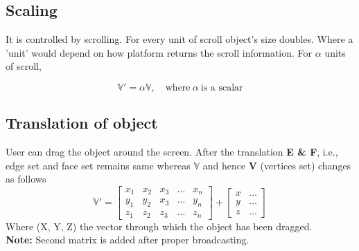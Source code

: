 \subsection{Scaling}
\indent It is controlled by scrolling. For every unit of scroll object's size doubles. Where a 'unit' would depend on how platform returns the scroll information. For $\alpha$ units of scroll,

$$ \mathbb{V}' = \alpha \mathbb{V}, \quad \textrm{where} \ \alpha \ \textrm{is a scalar}$$
\subsection{Translation of object}
User can drag the object around the screen. After the translation \textbf{E \& F}, i.e., edge set and face set remains same whereas  $\mathbb{V}$ and hence \textbf{V} (vertices set) changes as follows
$$ \mathbb{V}' = 
 \begin{bmatrix}
    x_{1}       & x_{2} & x_{3} & \dots & x_{n} \\
    y_{1}       & y_{2} & x_{3} & \dots & y_{n} \\
    z_{1}       & z_{2} & z_{3} & \dots & z_{n}
\end{bmatrix}
+
\begin {bmatrix}
	x & \dots \\
    y & \dots \\
    z & \dots
   
  \end{bmatrix}
$$
Where (X, Y, Z) the vector through which the object has been dragged. \\
\textbf{Note:} Second matrix is added after proper broadcasting.

